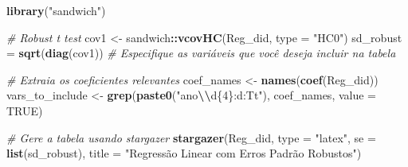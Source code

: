 \documentclass[
]{article}
\newenvironment{Shaded}{\begin{snugshade}}{\end{snugshade}}
\newcommand{\AttributeTok}[1]{\textcolor[rgb]{0.13,0.29,0.53}{#1}}
\newcommand{\CommentTok}[1]{\textcolor[rgb]{0.56,0.35,0.01}{\textit{#1}}}
\newcommand{\ConstantTok}[1]{\textcolor[rgb]{0.56,0.35,0.01}{#1}}
\newcommand{\FunctionTok}[1]{\textcolor[rgb]{0.13,0.29,0.53}{\textbf{#1}}}
\newcommand{\NormalTok}[1]{#1}
\newcommand{\OtherTok}[1]{\textcolor[rgb]{0.56,0.35,0.01}{#1}}
\newcommand{\SpecialCharTok}[1]{\textcolor[rgb]{0.81,0.36,0.00}{\textbf{#1}}}
\newcommand{\StringTok}[1]{\textcolor[rgb]{0.31,0.60,0.02}{#1}}
\begin{document}
\begin{Shaded}
\begin{Highlighting}[]
\FunctionTok{library}\NormalTok{(}\StringTok{"sandwich"}\NormalTok{)}

\CommentTok{\# Robust t test}
\NormalTok{cov1 }\OtherTok{\textless{}{-}}\NormalTok{ sandwich}\SpecialCharTok{::}\FunctionTok{vcovHC}\NormalTok{(Reg\_did, }\AttributeTok{type =} \StringTok{"HC0"}\NormalTok{)}
\NormalTok{sd\_robust }\OtherTok{=} \FunctionTok{sqrt}\NormalTok{(}\FunctionTok{diag}\NormalTok{(cov1))}
\CommentTok{\# Especifique as variáveis que você deseja incluir na tabela}

\CommentTok{\# Extraia os coeficientes relevantes}
\NormalTok{coef\_names }\OtherTok{\textless{}{-}} \FunctionTok{names}\NormalTok{(}\FunctionTok{coef}\NormalTok{(Reg\_did))}
\NormalTok{vars\_to\_include }\OtherTok{\textless{}{-}} \FunctionTok{grep}\NormalTok{(}\FunctionTok{paste0}\NormalTok{(}\StringTok{"ano}\SpecialCharTok{\textbackslash{}\textbackslash{}}\StringTok{d\{4\}:d:Tt"}\NormalTok{), coef\_names, }\AttributeTok{value =} \ConstantTok{TRUE}\NormalTok{)}


\CommentTok{\# Gere a tabela usando stargazer}
\FunctionTok{stargazer}\NormalTok{(Reg\_did, }\AttributeTok{type =} \StringTok{"latex"}\NormalTok{, }\AttributeTok{se =} \FunctionTok{list}\NormalTok{(sd\_robust), }
          \AttributeTok{title =} \StringTok{"Regressão Linear com Erros Padrão Robustos"}\NormalTok{)}
\end{Highlighting}
\end{Shaded}
\end{document}
